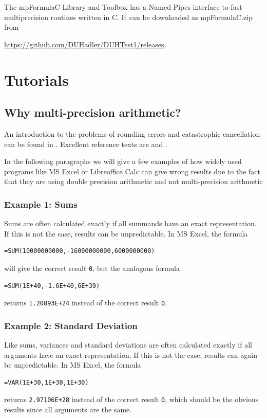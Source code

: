 The mpFormulaC  Library and Toolbox has a Named Pipes interface to fast multiprecision routines written in C. It can be downloaded as mpFormulaC.zip from 

\href{https://github.com/DUHadler/DUHTest1/releases}{https://github.com/DUHadler/DUHTest1/releases}. 









\chapter{Tutorials}
\label{Tutorials} 

\section{Why multi-precision arithmetic?}
\label{Why multiprecision arithmetic}

An introduction to the problems of rounding errors and catastrophic cancellation can be found in \cite{Goldberg91whatevery}. Excellent reference texts are  \cite{Higham2002} and \cite{Higham2009}.

In the following paragraphs we will give a few examples of how widely used programs like MS Excel or Libreoffice Calc can give wrong results due to the fact that they are using double precision arithmetic and not multi-precision arithmetic

\subsection{Example 1: Sums}

Sums are often calculated exactly if all summands have an exact representation. If this is not the case, results can be unpredictable. In MS Excel, the formula

\begin{verbatim}
=SUM(10000000000,-16000000000,6000000000)
\end{verbatim}
 will give the correct result  \verb|0|, but the analogous formula
 \begin{verbatim}
=SUM(1E+40,-1.6E+40,6E+39)
 \end{verbatim}
returns \verb|1.20893E+24| instead of the correct result \verb|0|.

\subsection{Example 2: Standard Deviation}
Like sums, variances and standard deviations are often calculated exactly if all arguments have an exact representation. If this is not the case, results can again be unpredictable. In MS Excel, the formula
 \begin{verbatim}
=VAR(1E+30,1E+30,1E+30)
 \end{verbatim}
returns \verb|2.97106E+28| instead of the correct result \verb|0|, which should be the obvious results since all arguments are the same.


